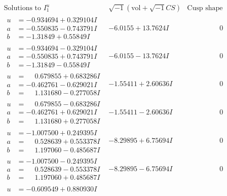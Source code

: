 \documentclass[1p]{elsarticle_modified}
\theoremstyle{definition}
\newcommand{\I}{\sqrt{-1}}
\begin{document}
$$\begin{array}{c|c|c}  
\text{Solutions to }I^u_{1}& \I (\text{vol} + \sqrt{-1}CS) & \text{Cusp shape}\\
 \hline 
\begin{aligned}
u &= -0.934694 + 0.329104 I \\
a &= -0.550835 - 0.743791 I \\
b &= -1.31849 + 0.55849 I\end{aligned}
 & -6.0155 + 13.7624 I & \phantom{-0.000000 } 0 \\ \hline\begin{aligned}
u &= -0.934694 - 0.329104 I \\
a &= -0.550835 + 0.743791 I \\
b &= -1.31849 - 0.55849 I\end{aligned}
 & -6.0155 - 13.7624 I & \phantom{-0.000000 } 0 \\ \hline\begin{aligned}
u &= \phantom{-}0.679855 + 0.683286 I \\
a &= -0.462761 - 0.629021 I \\
b &= \phantom{-}1.131680 - 0.277058 I\end{aligned}
 & -1.55411 + 2.60636 I & \phantom{-0.000000 } 0 \\ \hline\begin{aligned}
u &= \phantom{-}0.679855 - 0.683286 I \\
a &= -0.462761 + 0.629021 I \\
b &= \phantom{-}1.131680 + 0.277058 I\end{aligned}
 & -1.55411 - 2.60636 I & \phantom{-0.000000 } 0 \\ \hline\begin{aligned}
u &= -1.007500 + 0.249395 I \\
a &= \phantom{-}0.528639 + 0.553378 I \\
b &= \phantom{-}1.197060 - 0.485687 I\end{aligned}
 & -8.29895 + 6.75694 I & \phantom{-0.000000 } 0 \\ \hline\begin{aligned}
u &= -1.007500 - 0.249395 I \\
a &= \phantom{-}0.528639 - 0.553378 I \\
b &= \phantom{-}1.197060 + 0.485687 I\end{aligned}
 & -8.29895 - 6.75694 I & \phantom{-0.000000 } 0 \\ \hline\begin{aligned}
u &= -0.609549 + 0.880930 I \\

\end{aligned}
\end{array}$$
\end{document}
